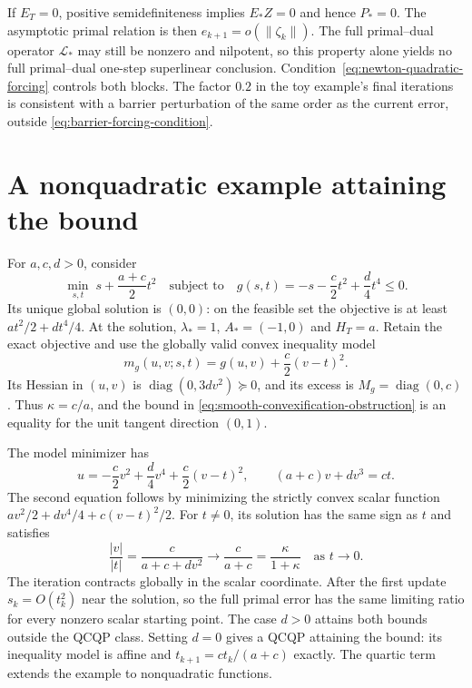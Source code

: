 \documentclass[pdflatex,sn-mathphys-num]{sn-jnl}
\theoremstyle{thmstyleone}
\theoremstyle{thmstylethree}
\begin{document}
If $E_T=0$, positive semidefiniteness implies $E_*Z=0$ and hence
$P_*=0$. The asymptotic primal relation is then
$e_{k+1}=o(\|\zeta_k\|)$. The full primal--dual operator
$\mathcal L_*$ may still be nonzero and nilpotent, so this property
alone yields no full primal--dual one-step superlinear conclusion.
Condition~\eqref{eq:newton-quadratic-forcing} controls both blocks.
The factor $0.2$ in the toy example's final iterations is consistent
with a barrier perturbation of the same order as the current error,
outside \eqref{eq:barrier-forcing-condition}.



\section{A nonquadratic example attaining the bound}\label{supp:smooth-attainment}
For $a,c,d>0$, consider
\begin{equation}\label{eq:smooth-attainment-example}
 \min_{s,t}\;s+\frac{a+c}{2}t^2
 \quad\text{subject to}\quad
 g(s,t)=-s-\frac c2t^2+\frac d4t^4\leq0.
\end{equation}
Its unique global solution is $(0,0)$: on the feasible set the objective
is at least $a t^2/2+d t^4/4$. At the solution, $\lambda_*=1$,
$A_*=(-1,0)$ and $H_T=a$. Retain the exact objective and use the
globally valid convex inequality model
\[
 m_g(u,v;s,t)=g(u,v)+\frac c2(v-t)^2.
\]
Its Hessian in $(u,v)$ is $\operatorname{diag}(0,3dv^2)\succeq0$,
and its excess is $M_g=\operatorname{diag}(0,c)$. Thus
$\kappa=c/a$, and the bound in
\eqref{eq:smooth-convexification-obstruction} is an equality for the
unit tangent direction $(0,1)$.

The model minimizer has
\[
 u=-\frac c2v^2+\frac d4v^4+\frac c2(v-t)^2,
 \qquad (a+c)v+dv^3=ct.
\]
The second equation follows by minimizing the strictly convex scalar
function $av^2/2+dv^4/4+c(v-t)^2/2$. For $t\ne0$, its solution has
the same sign as $t$ and satisfies
\[
 \frac{|v|}{|t|}=\frac c{a+c+dv^2}
 \longrightarrow\frac c{a+c}=\frac{\kappa}{1+\kappa}
 \quad\text{as }t\to0.
\]
The iteration contracts globally in the scalar coordinate. After the
first update $s_k=O(t_k^2)$ near the solution, so the full primal error
has the same limiting ratio for every nonzero scalar starting point.
The case $d>0$ attains both bounds outside the QCQP class. Setting $d=0$
gives a QCQP attaining the bound: its inequality model is affine and
$t_{k+1}=ct_k/(a+c)$ exactly. The quartic term extends the example to nonquadratic functions.
\end{document}
